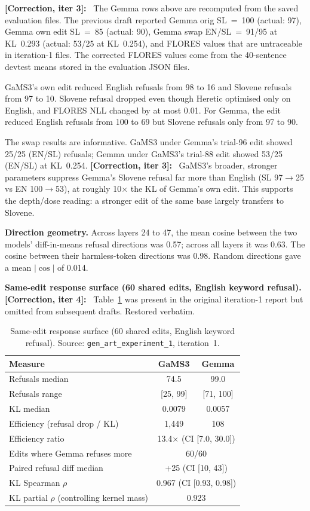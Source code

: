 \documentclass[11pt,letterpaper]{article}
\newcommand{\corr}[1]{\noindent\textbf{[Correction, iter #1]:}~}
\begin{document}
\corr{3} The Gemma rows above are recomputed from the saved evaluation files. The previous draft reported Gemma orig SL~=~100 (actual: 97), Gemma own edit SL~=~85 (actual: 90), Gemma swap EN/SL~=~91/95 at KL~0.293 (actual: 53/25 at KL~0.254), and FLORES values that are untraceable in iteration-1 files. The corrected FLORES values come from the 40-sentence devtest means stored in the evaluation JSON files.

GaMS3's own edit reduced English refusals from 98 to 16 and Slovene refusals from 97 to 10. Slovene refusal dropped even though Heretic optimised only on English, and FLORES NLL changed by at most 0.01. For Gemma, the edit reduced English refusals from 100 to 69 but Slovene refusals only from 97 to 90.

The swap results are informative. GaMS3 under Gemma's trial-96 edit showed 25/25 (EN/SL) refusals; Gemma under GaMS3's trial-88 edit showed 53/25 (EN/SL) at KL~0.254. \corr{3} GaMS3's broader, stronger parameters suppress Gemma's Slovene refusal far more than English (SL 97$\to$25 vs EN 100$\to$53), at roughly 10$\times$ the KL of Gemma's own edit. This supports the depth/dose reading: a stronger edit of the same base largely transfers to Slovene.

\textbf{Direction geometry.} Across layers 24 to 47, the mean cosine between the two models' diff-in-means refusal directions was 0.57; across all layers it was 0.63. The cosine between their harmless-token directions was 0.98. Random directions gave a mean $|\cos|$ of 0.014.

\textbf{Same-edit response surface (60 shared edits, English keyword refusal).} \corr{4} Table~\ref{tab:iter1_response_surface} was present in the original iteration-1 report but omitted from subsequent drafts. Restored verbatim.

\begin{table}[!htbp]
\centering
\caption{Same-edit response surface (60 shared edits, English keyword refusal). Source: \texttt{gen\_art\_experiment\_1}, iteration~1.}
\label{tab:iter1_response_surface}
\small
\begin{tabular}{lcc}
\toprule
Measure & GaMS3 & Gemma \\
\midrule
Refusals median & 74.5 & 99.0 \\
Refusals range & [25, 99] & [71, 100] \\
KL median & 0.0079 & 0.0057 \\
Efficiency (refusal drop / KL) & 1,449 & 108 \\
Efficiency ratio & \multicolumn{2}{c}{13.4$\times$ (CI [7.0, 30.0])} \\
Edits where Gemma refuses more & \multicolumn{2}{c}{60/60} \\
Paired refusal diff median & \multicolumn{2}{c}{+25 (CI [10, 43])} \\
KL Spearman $\rho$ & \multicolumn{2}{c}{0.967 (CI [0.93, 0.98])} \\
KL partial $\rho$ (controlling kernel mass) & \multicolumn{2}{c}{0.923} \\
\bottomrule
\end{tabular}
\end{table}
\end{document}

